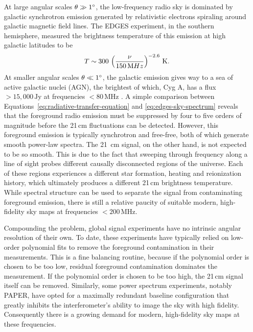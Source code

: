\begin{bibunit}
At large angular scales $\theta \gg 1\arcdeg$, the low-frequency radio sky is dominated by galactic
synchrotron emission generated by relativistic electrons spiraling around galactic magnetic field
lines. The EDGES experiment, in the southern hemisphere, measured the brightness temperature of this
emission at high galactic latitudes to be \citep{2017MNRAS.464.4995M}
\begin{equation}\label{eq:edges-sky-spectrum}
    T \sim 300\,\left(\frac{\nu}{150\,{\rm MHz}}\right)^{-2.6}\,\text{K}.
\end{equation}
At smaller angular scales $\theta \ll 1\arcdeg$, the galactic emission gives way to a sea of active
galactic nuclei (AGN), the brightest of which, Cyg A, has a flux $>15,000\,\text{Jy}$ at frequencies
$<80\,\text{MHz}$ \citep{1977A&A....61...99B}. A simple comparison between
Equations~\ref{eq:radiative-transfer-equation} and \ref{eq:edges-sky-spectrum} reveals that the
foreground radio emission must be suppressed by four to five orders of magnitude before the 21\,cm
fluctuations can be detected.  However, this foreground emission is typically synchrotron and
free-free, both of which generate smooth power-law spectra. The 21~cm signal, on the other hand, is
not expected to be so smooth. This is due to the fact that sweeping through frequency along a line
of sight probes different causally disconnected regions of the universe. Each of these regions
experiences a different star formation, heating and reionization history, which ultimately produces
a different 21\,cm brightness temperature.  While spectral structure can be used to separate the
signal from contaminating foreground emission, there is still a relative paucity of suitable modern,
high-fidelity sky maps at frequencies $<200\,\text{MHz}$.

Compounding the problem, global signal experiments have no intrinsic angular resolution of their
own. To date, these experiments have typically relied on low-order polynomial fits to remove the
foreground contamination in their measurements. This is a fine balancing routine, because if the
polynomial order is chosen to be too low, residual foreground contamination dominates the
measurement. If the polynomial order is chosen to be too high, the 21\,cm signal itself can be
removed. Similarly, some power spectrum experiments, notably PAPER, have opted for a maximally
redundant baseline configuration that greatly inhibits the interferometer's ability to image the sky
with high fidelity. Consequently there is a growing demand for modern, high-fidelity sky maps at
these frequencies.


\end{bibunit}
